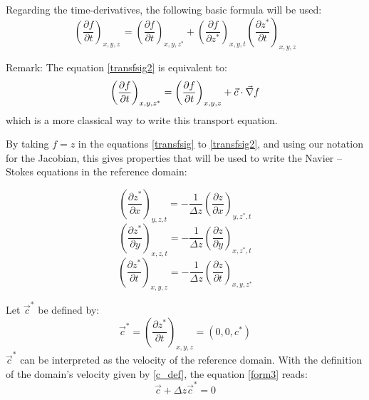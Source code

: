Regarding the time-derivatives, the following basic formula will be used:
\begin{equation}
\left(  \dfrac{\partial f}{\partial t}\right)_{x,y,z\,}=\left(
\dfrac{\partial f}{\partial t}\right)_{x,y,z^{\ast}}+\left(
\dfrac{\partial f}{\partial z^{\ast}}\right)_{x,y,t}\left(
\dfrac{\partial z^{\ast}}{\partial t}\right)_{x,y,z} \label{transfsig2}%
\end{equation}

\begin{CommentBlock}{Remark:}
The equation \eqref{transfsig2} is equivalent to:
\begin{equation}\label{transfsig2bis}
\left(\dfrac{\partial f}{\partial t}\right)_{x,y,z^*}=\left(\dfrac{\partial f}{\partial t}\right)_{x,y,z}
+\vec{c} \cdot \vec \nabla f
\end{equation}
which is a more  classical way to write this transport equation.
\end{CommentBlock}


By taking $f=z$ in the equations \eqref{transfsig} to \eqref{transfsig2},
and using our notation for the Jacobian, this
gives properties that will be used to write the Navier -- Stokes equations
in the reference domain:

\begin{equation}
\left(\dfrac{\partial z^{\ast}}{\partial x}\right)_{y,z,t}
=-\dfrac{1}{\Delta z}\left(\dfrac{\partial z}{\partial x}\right)
_{y,z^{\ast},t} \label{form1}%
\end{equation}
%
\begin{equation}
\left(\dfrac{\partial z^{\ast}}{\partial y}\right)_{x,z,t}
=-\dfrac{1}{\Delta z}\left(\dfrac{\partial z}{\partial y}\right)
_{x,z^{\ast},t} \label{form2}%
\end{equation}
%
\begin{equation}
\left(\dfrac{\partial z^{\ast}}{\partial t}\right)_{x,y,z}
=-\dfrac{1}{\Delta z}\left(\dfrac{\partial z}{\partial t}\right)
_{x,y,z^{\ast}} \label{form3}%
\end{equation}

Let $\vec{c}^*$ be defined by:
\begin{equation}\label{c*_def}
\vec{c}^*=\left(\dfrac{\partial z^*}{\partial t}\right)_{x,y,z}=\left(0, 0, c^*\right)
\end{equation}
$\vec{c}^*$ can be interpreted as the velocity of the reference domain.
With the definition of the domain's velocity given by \eqref{c_def}, the equation
\eqref{form3} reads:
\begin{equation}\label{velocitiesmesh}
\vec{c}+\Delta z\vec{c}^*=0
\end{equation}

